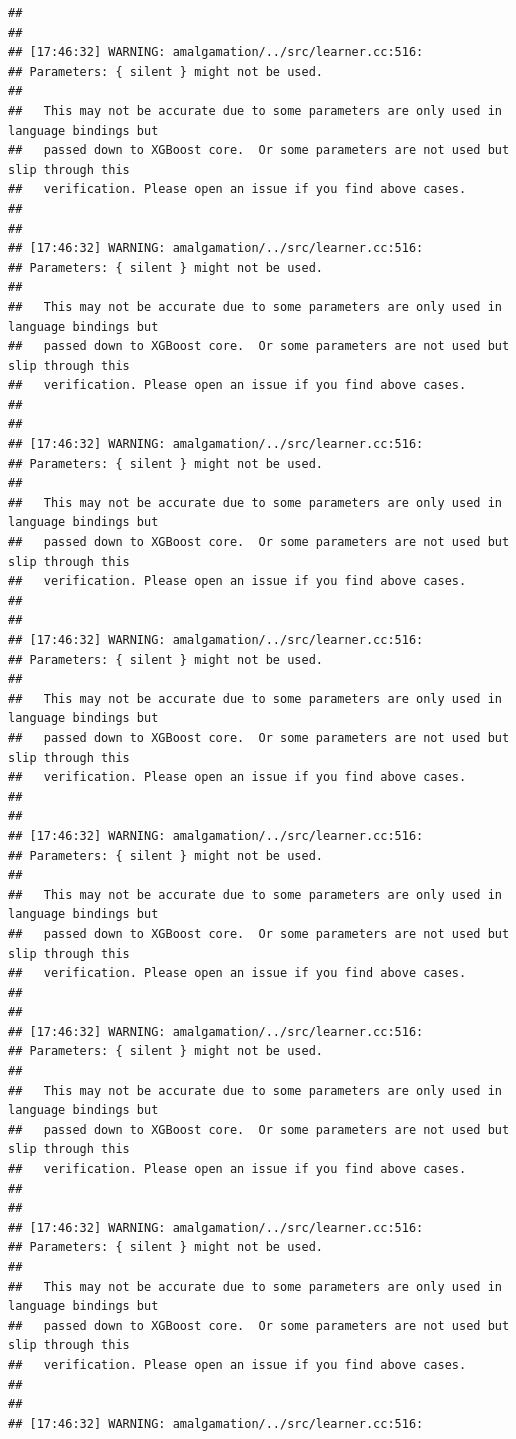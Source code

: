 \documentclass[AMS,STIX2COL]{WileyNJD-v2}\usepackage[]{graphicx}\usepackage[]{color}
\makeatletter
\newenvironment{kframe}{%
 \def\at@end@of@kframe{}%
 \ifinner\ifhmode%
  \def\at@end@of@kframe{\end{minipage}}%
  \begin{minipage}{\columnwidth}%
 \fi\fi%
 \def\FrameCommand##1{\hskip\@totalleftmargin \hskip-\fboxsep
 \colorbox{shadecolor}{##1}\hskip-\fboxsep
     \hskip-\linewidth \hskip-\@totalleftmargin \hskip\columnwidth}%
 \MakeFramed {\advance\hsize-\width
   \@totalleftmargin\z@ \linewidth\hsize
   \@setminipage}}%
 {\par\unskip\endMakeFramed%
 \at@end@of@kframe}
\newenvironment{knitrout}{}{} %
\makeatother
\begin{document}
\begin{knitrout}
\begin{kframe}
\begin{verbatim}
## 
## 
## [17:46:32] WARNING: amalgamation/../src/learner.cc:516: 
## Parameters: { silent } might not be used.
## 
##   This may not be accurate due to some parameters are only used in language bindings but
##   passed down to XGBoost core.  Or some parameters are not used but slip through this
##   verification. Please open an issue if you find above cases.
## 
## 
## [17:46:32] WARNING: amalgamation/../src/learner.cc:516: 
## Parameters: { silent } might not be used.
## 
##   This may not be accurate due to some parameters are only used in language bindings but
##   passed down to XGBoost core.  Or some parameters are not used but slip through this
##   verification. Please open an issue if you find above cases.
## 
## 
## [17:46:32] WARNING: amalgamation/../src/learner.cc:516: 
## Parameters: { silent } might not be used.
## 
##   This may not be accurate due to some parameters are only used in language bindings but
##   passed down to XGBoost core.  Or some parameters are not used but slip through this
##   verification. Please open an issue if you find above cases.
## 
## 
## [17:46:32] WARNING: amalgamation/../src/learner.cc:516: 
## Parameters: { silent } might not be used.
## 
##   This may not be accurate due to some parameters are only used in language bindings but
##   passed down to XGBoost core.  Or some parameters are not used but slip through this
##   verification. Please open an issue if you find above cases.
## 
## 
## [17:46:32] WARNING: amalgamation/../src/learner.cc:516: 
## Parameters: { silent } might not be used.
## 
##   This may not be accurate due to some parameters are only used in language bindings but
##   passed down to XGBoost core.  Or some parameters are not used but slip through this
##   verification. Please open an issue if you find above cases.
## 
## 
## [17:46:32] WARNING: amalgamation/../src/learner.cc:516: 
## Parameters: { silent } might not be used.
## 
##   This may not be accurate due to some parameters are only used in language bindings but
##   passed down to XGBoost core.  Or some parameters are not used but slip through this
##   verification. Please open an issue if you find above cases.
## 
## 
## [17:46:32] WARNING: amalgamation/../src/learner.cc:516: 
## Parameters: { silent } might not be used.
## 
##   This may not be accurate due to some parameters are only used in language bindings but
##   passed down to XGBoost core.  Or some parameters are not used but slip through this
##   verification. Please open an issue if you find above cases.
## 
## 
## [17:46:32] WARNING: amalgamation/../src/learner.cc:516: 

\end{verbatim}
\end{kframe}
\end{knitrout}
\end{document}
